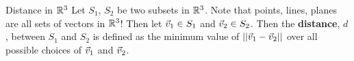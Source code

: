 \begin{definition}{Distance in $\mathbb{R}^3$}
Let $S_1$, $S_2$ be two subsets in $\mathbb{R}^3$. Note that points, lines, planes are all sets of vectors in $\mathbb{R}^3$! Then let $\vec{v}_1\in S_1$ and $\vec{v}_2\in S_2$. Then the \textbf{distance}, $d$, between $S_1$ and $S_2$ is defined as the minimum value of $||\vec{v}_1-\vec{v}_2||$ over all possible choices of $\vec{v}_1$ and $\vec{v}_2$.
\end{definition}